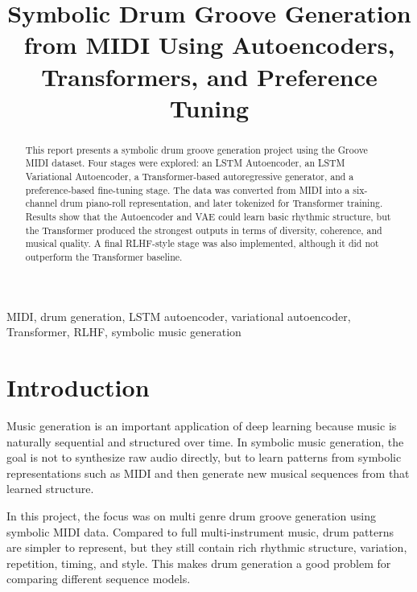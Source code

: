 \documentclass[conference]{IEEEtran}
\begin{document}
\title{Symbolic Drum Groove Generation from MIDI Using Autoencoders, Transformers, and Preference Tuning}

\author{
}

\maketitle

\begin{abstract}
This report presents a symbolic drum groove generation project using the Groove MIDI dataset. Four stages were explored: an LSTM Autoencoder, an LSTM Variational Autoencoder, a Transformer-based autoregressive generator, and a preference-based fine-tuning stage. The data was converted from MIDI into a six-channel drum piano-roll representation, and later tokenized for Transformer training. Results show that the Autoencoder and VAE could learn basic rhythmic structure, but the Transformer produced the strongest outputs in terms of diversity, coherence, and musical quality. A final RLHF-style stage was also implemented, although it did not outperform the Transformer baseline.
\end{abstract}

\begin{IEEEkeywords}
MIDI, drum generation, LSTM autoencoder, variational autoencoder, Transformer, RLHF, symbolic music generation
\end{IEEEkeywords}

\section{Introduction}
Music generation is an important application of deep learning because music is naturally sequential and structured over time. In symbolic music generation, the goal is not to synthesize raw audio directly, but to learn patterns from symbolic representations such as MIDI and then generate new musical sequences from that learned structure.

In this project, the focus was on {multi genre drum groove generation} using symbolic MIDI data. Compared to full multi-instrument music, drum patterns are simpler to represent, but they still contain rich rhythmic structure, variation, repetition, timing, and style. This makes drum generation a good problem for comparing different sequence models.
\end{document}
